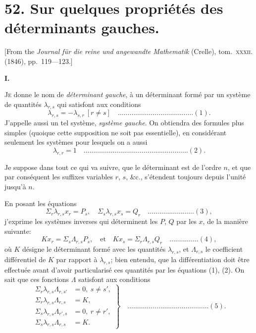 \documentclass[12pt,a4paper]{article}
\theoremstyle{plain}
\begin{document}
\newpage


\section*{52. Sur quelques propri\'et\'es des d\'eterminants gauches.}

[From the \textit{Journal f\"ur die reine und angewandte Mathematik} (Crelle), tom.~\textsc{xxxii}. (1846), pp.~119---123.]

\bigskip

\textbf{I.}

\textsc{Je} donne le nom de \textit{d\'eterminant gauche}, \`a un d\'eterminant form\'e par un syst\`eme de quantit\'es $\lambda_{r,s}$ qui satisfont aux conditions
\[
\lambda_{r,s} = -\lambda_{s,r}\ [r \neq s] \quad \ldots \ldots \ldots \ldots \ldots \ldots \ldots \ldots \ldots \ldots \ldots \ldots \ldots (1).
\]
J'appelle aussi un tel syst\`eme, \textit{syst\`eme gauche}. On obtiendra des formules plus simples (quoique cette supposition ne soit pas essentielle), en consid\'erant seulement les syst\`emes pour lesquels on a aussi
\[
\lambda_{r,r} = 1 \quad \ldots \ldots \ldots \ldots \ldots \ldots \ldots \ldots \ldots \ldots \ldots \ldots \ldots \ldots \ldots \ldots \ldots \ldots (2).
\]

Je suppose dans tout ce qui va suivre, que le d\'eterminant est de l'ordre $n$, et que par cons\'equent les suffixes variables $r$, $s$, \&c., s'\'etendent toujours depuis l'unit\'e jusqu'\`a $n$.

En posant les \'equations
\[
\Sigma_r \lambda_{r,s} x_r = P_s, \quad \Sigma_s \lambda_{r,s} x_s = Q_r \quad \ldots \ldots \ldots \ldots \ldots \ldots \ldots \ldots (3),
\]
j'exprime les syst\`emes inverses qui d\'eterminent les $P$, $Q$ par les $x$, de la mani\`ere suivante:
\[
K x_r = \Sigma_s \Lambda_{r,s} P_s, \quad \text{et} \quad K x_s = \Sigma_r \Lambda_{r,s} Q_r \quad \ldots \ldots \ldots \ldots \ldots (4),
\]
o\`u $K$ d\'esigne le d\'eterminant form\'e avec les quantit\'es $\lambda_{r,s}$, et $\Lambda_{r,s}$ le coefficient diff\'erentiel de $K$ par rapport \`a $\lambda_{r,s}$; bien entendu, que la diff\'erentiation doit \^etre effectu\'ee avant d'avoir particularis\'e ces quantit\'es par les \'equations (1), (2). On sait que ces fonctions $\Lambda$ satisfont aux conditions
\[
\left. \begin{aligned}
\Sigma_r \lambda_{r,s} \Lambda_{r,s'} &= 0,\ s \neq s', \\
\Sigma_r \lambda_{r,s} \Lambda_{r,s} &= K, \\
\Sigma_s \lambda_{r,s} \Lambda_{r',s} &= 0,\ r \neq r', \\
\Sigma_s \lambda_{r,s} \Lambda_{r,s} &= K.
\end{aligned} \right\} \quad \ldots \ldots \ldots \ldots \ldots \ldots \ldots \ldots \ldots \ldots \ldots \ldots \ldots \ldots (5).
\]
\end{document}
